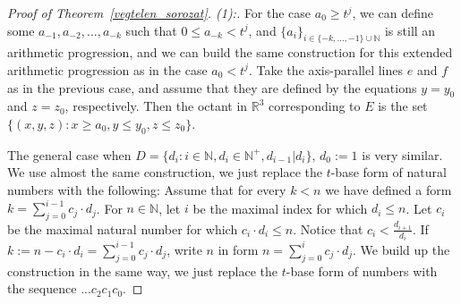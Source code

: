 \documentclass[11pt,oneside]{amsart}
\newcommand{\N}{\mathbb{N}}
\begin{document}
\begin{proof}[Proof of Theorem~\ref{vegtelen_sorozat}. (1):]
    For the case $a_0 \geq t^j$, we can define some $a_{-1}, a_{-2},...,a_{-k}$ such that $0\leq a_{-k} < t^j$, and $\{a_i\}_{i \in \{-k, ..., -1\} \cup \mathbb{N}}$ is still an arithmetic progression, and we can build the same construction for this extended arithmetic progression as in the case $a_0<t^j$. Take the axis-parallel lines $e$ and $f$ as in the previous case, and assume that they are defined by the equations $y=y_0$ and $z=z_0$, respectively. Then the octant in $\mathbb{R}^3$ corresponding to $E$ is the set $\{(x,y,z): x \geq a_0, y \leq y_0, z \leq z_0\}$. 
    
    The general case when $D = \{d_i: i\in\N, d_i \in \mathbb{N}^+, d_{i-1} | d_{i}\}$, $d_0:=1$ is very similar. We use almost the same construction, we just replace the $t$-base form of natural numbers with the following: Assume that for every $k<n$ we have defined a form $k = \sum\limits_{j=0}^{i-1} c_j \cdot d_j$. For $n \in \mathbb{N}$, let $i$ be the maximal index for which $d_i \leq n$. Let $c_i$ be the maximal natural number for which $c_i \cdot d_i \leq n$. Notice that $c_i<\frac{d_{i+1}}{d_i}$. If $k := n-c_i \cdot d_i = \sum\limits_{j=0}^{i-1} c_j \cdot d_j$, write $n$ in form $n = \sum\limits_{j=0}^{i} c_j \cdot d_j$. We build up the construction in the same way, we just replace the $t$-base form of numbers with the sequence $...c_2c_1c_0$.
    \end{proof}
\end{document}
